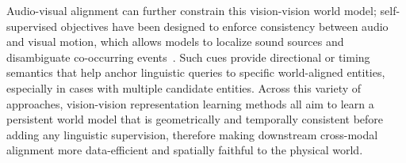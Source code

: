 Audio-visual alignment can further constrain this vision-vision world model; self-supervised objectives have been designed to enforce consistency between audio and visual motion, which allows models to localize sound sources and disambiguate co-occurring events~\cite{arandjelovic2017look, owens2018audio, zhao2018sound}. 
Such cues provide directional or timing semantics that help anchor linguistic queries to specific world-aligned entities, especially in cases with multiple candidate entities. 
Across this variety of approaches, vision-vision representation learning methods all aim to learn a persistent world model that is geometrically and temporally consistent before adding any linguistic supervision, therefore making downstream cross-modal alignment more data-efficient and spatially faithful to the physical world.
